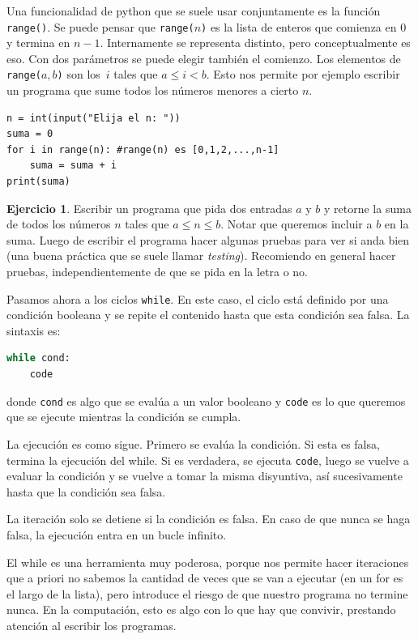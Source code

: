 \documentclass[a4paper, 12pt]{report}
\theoremstyle{definition}
\newtheorem{ejercicio}{Ejercicio}[section]
\begin{document}
Una funcionalidad de python que se suele usar conjuntamente es la función {\tt range()}. Se puede pensar que {\tt range($n$)} es la lista de enteros que comienza en $0$ y termina en $n-1$. Internamente se representa distinto, pero conceptualmente es eso. Con dos parámetros se puede elegir también el comienzo. Los elementos de {\tt range($a,b$)} son los~$i$ tales que $a\leq i<b$. Esto nos permite por ejemplo escribir un programa que sume todos los números menores a cierto $n$.
\begin{verbatim}
n = int(input("Elija el n: "))
suma = 0
for i in range(n): #range(n) es [0,1,2,...,n-1]
    suma = suma + i
print(suma)
\end{verbatim}
\begin{ejercicio}
	Escribir un programa que pida dos entradas $a$ y $b$ y retorne la suma de todos los números $n$ tales que $a\leq n\leq b$. Notar que queremos incluir a $b$ en la suma. Luego de escribir el programa hacer algunas pruebas para ver si anda bien (una buena práctica que se suele llamar {\sl testing}). Recomiendo en general hacer pruebas, independientemente de que se pida en la letra o no.
\end{ejercicio}

Pasamos ahora a los ciclos {\tt while}. En este caso, el ciclo está definido por una condición booleana y se repite el contenido hasta que esta condición sea falsa. La sintaxis es:
\begin{lstlisting}[language=python]
while cond:
    code
\end{lstlisting}
donde {\tt cond} es algo que se evalúa a un valor booleano y {\tt code} es lo que queremos que se ejecute mientras la condición se cumpla.

La ejecución es como sigue. Primero se evalúa la condición. Si esta es falsa, termina la ejecución del while. Si es verdadera, se ejecuta {\tt code}, luego se vuelve a evaluar la condición y se vuelve a tomar la misma disyuntiva, así sucesivamente hasta que la condición sea falsa.

La iteración solo se detiene si la condición es falsa. En caso de que nunca se haga falsa, la ejecución entra en un bucle infinito.

El while es una herramienta muy poderosa, porque nos permite hacer iteraciones que a priori no sabemos la cantidad de veces que se van a ejecutar (en un for es el largo de la lista), pero introduce el riesgo de que nuestro programa no termine nunca. En la computación, esto es algo con lo que hay que convivir, prestando atención al escribir los programas.
\end{document}

